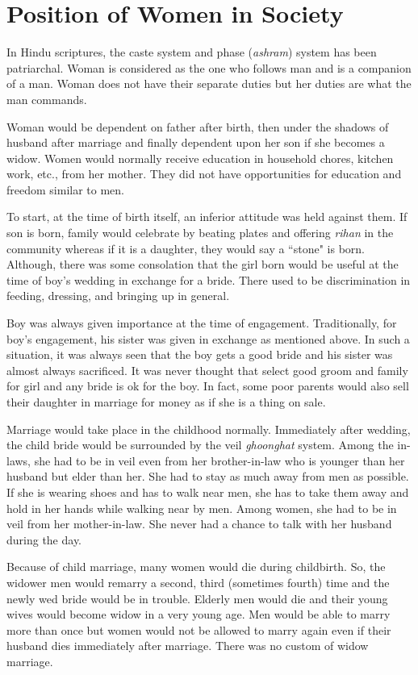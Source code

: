 \chapter{Position of Women in Society}
In Hindu scriptures, the caste system and phase (\textit{ashram}) system has
been patriarchal. Woman is considered as the one who follows man and is a
companion of a man. Woman does not have their separate duties but her duties
are what the man commands.

Woman would be dependent on father after birth, then under the shadows of
husband after marriage and finally dependent upon her son if she becomes a
widow. Women would normally receive education in household chores, kitchen
work, etc., from her mother. They did not have opportunities for education and
freedom similar to men.

To start, at the time of birth itself, an inferior attitude was held against
them. If son is born, family would celebrate by beating plates and offering
\textit{rihan} in the community whereas if it is a daughter, they would say a
``stone" is born. Although, there was some consolation that the girl born would
be useful at the time of boy's wedding in exchange for a bride. There used to
be discrimination in feeding, dressing, and bringing up in general.

Boy was always given importance at the time of engagement. Traditionally, for
boy's engagement, his sister was given in exchange as mentioned above. In such
a situation, it was always seen that the boy gets a good bride and his sister
was almost always sacrificed. It was never thought that select good groom and
family for girl and any bride is ok for the boy. In fact, some poor parents
would also sell their daughter in marriage for money as if she is a thing on
sale.

Marriage would take place in the childhood normally. Immediately after wedding,
the child bride would be surrounded by the veil \textit{ghoonghat} system. Among
the in-laws, she had to be in veil even from her brother-in-law who is younger
than her husband but elder than her. She had to stay as much away from men as
possible. If she is wearing shoes and has to walk near men, she has to take
them away and hold in her hands while walking near by men. Among women, she had
to be in veil from her mother-in-law. She never had a chance to talk with her
husband during the day.

Because of child marriage, many women would die during childbirth. So, the
widower men would remarry a second, third (sometimes fourth) time and the newly
wed bride would be in trouble. Elderly men would die and their young wives
would become widow in a very young age. Men would be able to marry more than
once but women would not be allowed to marry again even if their husband dies
immediately after marriage. There was no custom of widow marriage.

